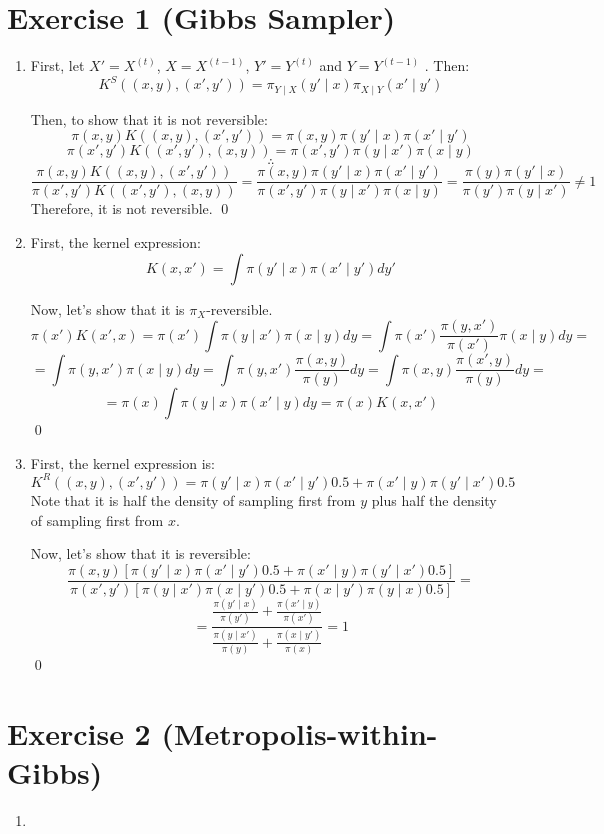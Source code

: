 \documentclass[12pt,letterpaper]{article}
\begin{document}

\section*{Exercise 1 (Gibbs Sampler)}
\begin{enumerate}[leftmargin=!,labelindent=5pt]
\item First, let $X' = X^{(t)}$, $X = X^{(t-1)}$, $Y' = Y^{(t)}$ and
$Y = Y^{(t-1)}$
. Then:
$$
K^S((x,y),(x',y')) = \pi_{Y\mid X}(y' \mid x) \pi_{X \mid Y}(x' \mid y')
$$

Then, to show that it is not reversible:
$$
\pi(x,y)K((x,y),(x',y')) = \pi(x,y) \pi(y' \mid x) \pi(x' \mid y')
$$
$$ 
\pi(x',y')K((x',y'),(x,y)) = \pi(x',y') \pi(y \mid x') \pi(x \mid y)
$$
$$
\therefore
$$
$$
\frac{\pi(x,y)K((x,y),(x',y'))}
{\pi(x',y')K((x',y'),(x,y))} =
\frac{\pi(x,y) \pi(y' \mid x) \pi(x' \mid y')}
{\pi(x',y') \pi(y \mid x') \pi(x \mid y)} = 
\frac{\pi(y)\pi(y' \mid x)}
{\pi(y')\pi(y \mid x')} \neq 1
$$
Therefore, it is not reversible.
\qed

\item First, the kernel expression:
$$
K(x, x') = \int \pi(y' \mid x) \pi(x' \mid y') dy'
$$

Now, let's show that it is $\pi_X$-reversible.
$$
\pi(x')K(x', x) = \pi(x') \int \pi(y \mid x') \pi(x \mid y) dy
=
\int \pi(x') \frac{\pi(y,x')}{\pi(x')}\pi(x\mid y) dy =
$$
$$
=
\int \pi(y,x') \pi(x \mid y) dy = 
\int \pi(y,x') \frac{\pi(x,y)}{\pi(y)}dy =
\int \pi(x,y) \frac{\pi(x',y)}{\pi(y)}dy =
$$
$$
= \pi(x)\int \pi(y \mid x) \pi(x' \mid y)  dy = \pi(x)K(x,x')
$$
\qed

\item First, the kernel expression is:
$$
K^R((x,y),(x',y')) = 
\pi(y' \mid x)\pi(x' \mid y')0.5 + \pi(x' \mid y)\pi(y' \mid x')0.5
$$
Note that it is half the density of sampling first from $y$ plus 
half the density of sampling first from $x$.

Now, let's show that it is reversible:
$$
\frac{\pi(x,y)[\pi(y' \mid x)\pi(x' \mid y')0.5 +
\pi(x' \mid y)\pi(y' \mid x')0.5]}
{
\pi(x',y')[\pi(y \mid x')\pi(x \mid y')0.5 +
\pi(x \mid y')\pi(y \mid x)0.5 ]
} = 
$$
$$ =
\frac{
	\frac{\pi(y' \mid x)}
	{\pi(y')}
	+
	\frac{\pi(x' \mid y)}
	{\pi(x')}
}
{
	\frac{\pi(y \mid x')}
	{\pi(y)}
	+
	\frac{\pi(x \mid y')}
	{\pi(x)}
} = 
1
$$
\qed
\end{enumerate}

\newpage
\section*{Exercise 2 (Metropolis-within-Gibbs)}
\begin{enumerate}[leftmargin=!,labelindent=5pt]
\item 
\end{enumerate}
\end{document}
